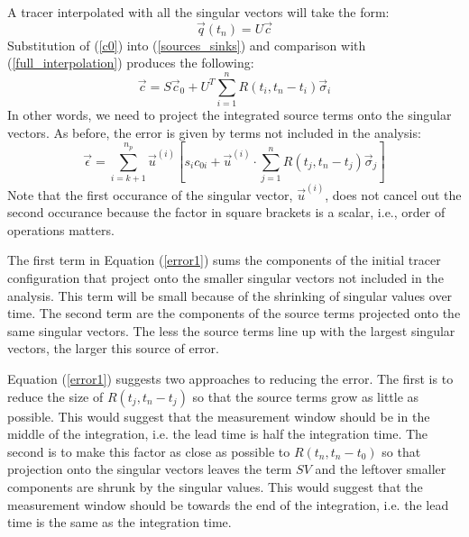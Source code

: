 \documentclass{article}
\begin{document}
A tracer interpolated with all the singular vectors will take the form:
\begin{equation}
	\vec q(t_n) = U \vec c
	\label{full_interpolation}
\end{equation}
Substitution of (\ref{c0}) into (\ref{sources_sinks}) and comparison with
(\ref{full_interpolation}) produces
the following:
\begin{equation}
	\vec c = S \vec c_0 + U^T \sum_{i=1}^n R(t_i, t_n-t_i) \vec \sigma_i
\end{equation}
In other words, we need to project the integrated source terms onto the
singular vectors.
As before, the error is given by terms not included in the analysis:
\begin{equation}
	\vec \epsilon = \sum_{i=k+1}^{n_p} \vec u^{(i)} \left [s_i c_{0i}
	+ \vec u^{(i)} \cdot \sum_{j=1}^n R(t_j, t_n-t_j) \vec \sigma_j \right ]
	\label{error1}
\end{equation}
Note that the first occurance of the singular vector, $\vec u^(i)$, does not
cancel out the second occurance because the factor in square brackets is a scalar, i.e., order of operations matters.

The first term in Equation (\ref{error1}) sums the components of the initial tracer configuration that project onto the smaller singular vectors not included in the analysis. 
This term will be small because of the shrinking of singular values over time.
The second term are the components of the source terms projected onto the same singular vectors.
The less the source terms line up with the largest singular vectors, the
larger this source of error.

Equation (\ref{error1}) suggests two approaches to reducing the error.
The first is to reduce the size of $R(t_j, t_n-t_j)$ so that the source terms
grow as little as possible.
This would suggest that the measurement window should be in the middle
of the integration, i.e. the lead time is half the integration time.
The second is to make this factor as close as possible to $R(t_n, t_n-t_0)$
so that projection onto the singular vectors leaves the term $SV$ and
the leftover smaller components are shrunk by the singular values.
This would suggest that the measurement window should be towards the end
of the integration, i.e. the lead time is the same as the integration time.
\end{document}
